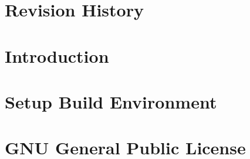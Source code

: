 \documentclass[german,a4paper,11pt]{refrep}
\begin{document}
\chapter{Revision History}\label{cha:revhist}


\chapter{Introduction}\label{cha:intrudoction}
%

\chapter{Setup Build Environment}


%

%

\pagestyle{empty}\hypersetup{linkcolor=orange}
\printindex

\appendix

\chapter{GNU General Public License}\label{cha:gnu-general-public}


\end{document}
